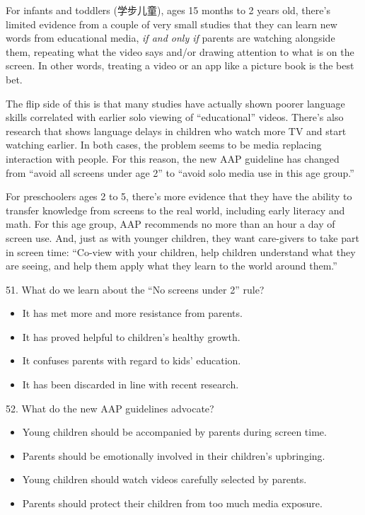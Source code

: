 \documentclass[UTF8,11pt]{ctexart}
\begin{document}
For infants and toddlers (学步儿童), ages 15 months to 2 years old, there’s limited evidence from a couple of very small studies that they can learn new words from educational media, \textit{if and only if} parents are watching alongside them, repeating what the video says and/or drawing attention to what is on the screen. In other words, treating a video or an app like a picture book is the best bet.


The flip side of this is that many studies have actually shown poorer language skills correlated with earlier solo viewing of “educational” videos. There’s also research that shows language delays in children who watch more TV and start watching earlier. In both cases, the problem seems to be media replacing interaction with people. For this reason, the new AAP guideline has changed from “avoid all screens under age 2” to “avoid solo media use in this age group.”


For preschoolers ages 2 to 5, there’s more evidence that they have the ability to transfer knowledge from screens to the real world, including early literacy and math. For this age group, AAP recommends no more than an hour a day of screen use. And, just as with younger children, they want care-givers to take part in screen time: “Co-view with your children, help children understand what they are seeing, and help them apply what they learn to the world around them.”


51. What do we learn about the “No screens under 2” rule?


\begin{itemize}[leftmargin=2em,itemsep=.2em,topsep=.4em]\item[A.] It has met more and more resistance from parents.
\item[B.] It has proved helpful to children’s healthy growth.
\item[C.] It confuses parents with regard to kids’ education.
\item[D.] It has been discarded in line with recent research.
\end{itemize}

52. What do the new AAP guidelines advocate?


\begin{itemize}[leftmargin=2em,itemsep=.2em,topsep=.4em]\item[A.] Young children should be accompanied by parents during screen time.
\item[B.] Parents should be emotionally involved in their children’s upbringing.
\item[C.] Young children should watch videos carefully selected by parents.
\item[D.] Parents should protect their children from too much media exposure.
\end{itemize}
\end{document}
